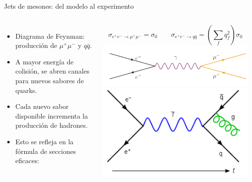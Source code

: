 \documentclass{beamer}
\begin{document}
\begin{frame}{Jets de mesones: del modelo al experimento}
  \begin{columns}
    \small
    \begin{itemize}
      \item Diagrama de Feynman: producción de \(\mu^+\mu^-\) y \(q\bar{q}\).
      \item A mayor energía de colisión, se abren canales para nuevos sabores de quarks.
      \item Cada nuevo sabor disponible incrementa la producción de hadrones.
      \item Esto se refleja en la fórmula de secciones eficaces:
    \end{itemize}
    \vspace{0.5em}
    \[
    \sigma_{e^+e^- \to \mu^+\mu^-} = \sigma_0 \quad \quad
    \sigma_{e^+e^- \to q\bar{q}} = \left( \sum_f q_f^2 \right)\sigma_0
    \]
    \includegraphics[width=\linewidth]{figures/feynman_diagrams1-2.png}
    \includegraphics[width=\linewidth]{figures/feynman_diagrams2-2.png}
  \end{columns}
\end{frame}
\end{document}
